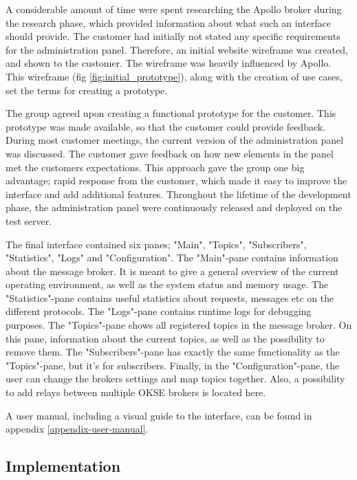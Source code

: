 A considerable amount of time were spent researching the Apollo broker during the research phase, which provided information about what such an interface should provide. The customer had initially not stated any specific requirements for the administration panel. Therefore, an initial website wireframe was created, and shown to the customer. The wireframe was heavily influenced by Apollo. This wireframe (fig \ref{fig:initial_prototype}), along with the creation of use cases, set the terms for creating a prototype.

The group agreed upon creating a functional prototype for the customer. This prototype was made available, so that the customer could provide feedback. During most customer meetings, the current version of the administration panel was discussed. The customer gave feedback on how new elements in the panel met the customers expectations. This approach gave the group one big advantage; rapid response from the customer, which made it easy to improve the interface and add additional features. Throughout the lifetime of the development phase, the administration panel were continuously released and deployed on the test server.

The final interface contained six panes; "Main", "Topics", "Subscribers", "Statistics", "Logs" and "Configuration". The "Main"-pane contains information about the message broker. It is meant to give a general overview of the current operating environment, as well as the system status and memory usage. The "Statistics"-pane contains useful statistics about requests, messages etc on the different protocols. The "Logs"-pane contains runtime logs for debugging purposes. The "Topics"-pane shows all registered topics in the message broker. On this pane, information about the current topics, as well as the possibility to remove them. The "Subscribers"-pane has exactly the same functionality as the "Topics"-pane, but it's for subscribers. Finally, in the "Configuration"-pane, the user can change the brokers settings and map topics together. Also, a possibility to add relays between multiple OKSE brokers is located here.

A user manual, including a visual guide to the interface, can be found in appendix \ref{appendix-user-manual}.

\subsection{Implementation}
\label{subsec:architecture_and_implementation-implementation}

